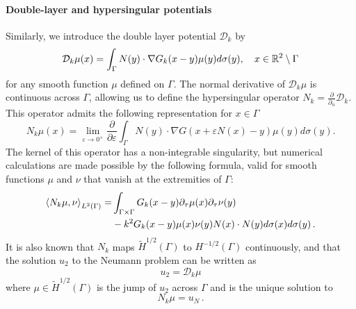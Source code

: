 \documentclass[a4paper]{article}
\begin{document}
\paragraph{Double-layer and hypersingular potentials}
Similarly, we introduce the double layer potential $\mathcal{D}_k$ by 
\[\mathcal{D}_k \mu(x) = \int_{\Gamma} N(y) \cdot \nabla G_k(x-y) \mu(y) d\sigma(y), \quad  x \in \mathbb{R}^2 \setminus \Gamma\]
for any smooth function $\mu$ defined on $\Gamma$.
The normal derivative of $\mathcal{D}_k\mu$ is continuous across $\Gamma$, allowing us to define the hypersingular operator $N_k = \frac{\partial}{\partial_n}\mathcal{D}_k$. This operator admits the following representation for $x\in \Gamma$
\begin{equation}
N_k \mu(x) = \lim_{\varepsilon \to 0^+} \frac{\partial}{\partial \varepsilon}\int_{\Gamma} N(y) \cdot \nabla G(x + \varepsilon N(x) - y) \mu(y) d\sigma(y).
\label{defNk}
\end{equation}
The kernel of this operator has a non-integrable singularity, but numerical calculations are made possible by the following formula, valid for smooth functions $\mu$ and $\nu$ that vanish at the extremities of $\Gamma$: 
\begin{equation}
\label{NkenfonctiondeSk}
	\begin{split}
		\left\langle N_k \mu,\nu\right\rangle_{L^2(\Gamma)} = &\int_{\Gamma\times \Gamma} G_k(x-y) \partial_\tau \mu(x) \partial_\tau \nu(y)\\
		& - k^2 G_k(x-y) \mu(x) \nu(y)N(x) \cdot N(y) d\sigma(x) d\sigma(y)\,.
	\end{split}
\end{equation}
It is also known that $N_k$ maps $\tilde{H}^{1/2}(\Gamma)$ to $H^{-1/2}(\Gamma)$ continuously, and that the solution $u_2$ to the Neumann problem can be written as
\begin{equation}
u_2 = \mathcal{D}_k \mu
\end{equation}
where $\mu \in \tilde{H}^{1/2}(\Gamma)$ is the jump of $u_2$ across $\Gamma$ and is the unique solution to
\begin{equation}
N_k \mu = u_N\,.
\label{Nkmu}
\end{equation}  
\end{document}
